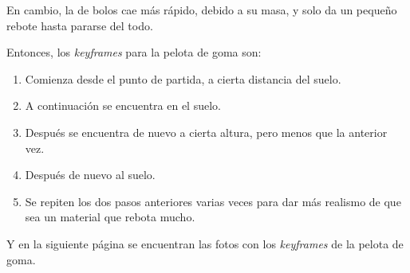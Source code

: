 \documentclass{article}
\begin{document}
\bigskip

En cambio, la de bolos cae más rápido, debido a su masa, y solo da un pequeño rebote hasta pararse del todo.

\bigskip

Entonces, los \textit{keyframes} para la pelota de goma son:

\begin{enumerate}
    \item Comienza desde el punto de partida, a cierta distancia del suelo.
    \item A continuación se encuentra en el suelo.
    \item Después se encuentra de nuevo a cierta altura, pero menos que la anterior vez.
    \item Después de nuevo al suelo.
    \item Se repiten los dos pasos anteriores varias veces para dar más realismo de que sea un material que rebota mucho.
\end{enumerate}

Y en la siguiente página se encuentran las fotos con los \textit{keyframes} de la pelota de goma.
\end{document}
